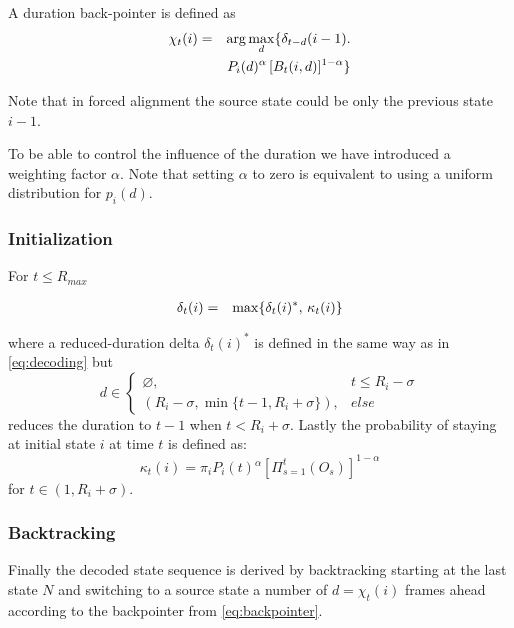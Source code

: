 \documentclass{article}
\begin{document}
A duration back-pointer is defined as
\begin{eqnarray}
\chi_{t}(i) & = & \arg\max_{d}\{\delta_{t-d}(i-1).\nonumber \\
 &  & P_{i}(d)^{\alpha}\thinspace[B_{t}(i,d)]^{1-\alpha}\}\label{eq:backpointer}
\end{eqnarray}


Note that in forced alignment the source state could be only the previous
state $i-1$. %



To be able to control the influence of the duration we have introduced
a weighting factor $\alpha$. Note that setting $\alpha$ to zero
is equivalent to using a uniform distribution for $p_{i}(d)$.







\subsubsection{Initialization}

For $t\leq R_{max}$

\begin{eqnarray}
\delta_{t}(i) & = & \max\{\delta_{t}(i)^{*},\thinspace\kappa_{t}(i)\}\label{eq:deltaStarOrKappa}
\end{eqnarray}


where a reduced-duration delta $\delta_{t}(i)^{*}$ is defined in
the same way as in \eqref{eq:decoding} but 
\begin{equation}
d\in\begin{cases}
\varnothing, & t\le R_{i}-\sigma\\
(R_{i}-\sigma,\min\{t-1,R_{i}+\sigma\}), & else
\end{cases}
\end{equation}
 reduces the duration to $t-1$ when $t<R_{i}+\sigma$.  Lastly the probability of staying at initial state $i$ at time $t$
is defined as: 
\begin{equation}
\kappa_{t}(i)=\pi_{i}P_{i}(t){}^{\alpha}[\Pi_{s=1}^{t}(O_{s})]^{1-\alpha}
\end{equation}
 for $t\in(1,R_{i}+\sigma)$.


\subsubsection{Backtracking}
Finally the decoded state sequence is derived by backtracking starting
at the last state $N$ and switching to a source state a number of
$d=\chi_{t}(i)$ frames ahead according to the backpointer from \eqref{eq:backpointer}.
\end{document}
